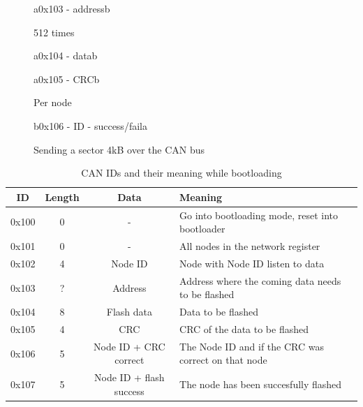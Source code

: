 \documentclass[twocolumn]{article}
\begin{document}
			\begin{figure}[t]
				\centering
				\begin{sequencediagram}
					
					\begin{call}{a}{0x103 - address}{b}{} %
					\end{call}
					\begin{sdloop}{512 times}
						\begin{call}{a}{0x104 - data}{b}{} %
						\end{call}
					\end{sdloop}
					\begin{call}{a}{0x105 - CRC}{b}{} %
						\begin{sdloop}{Per node}
							\begin{call}{b}{0x106 - ID - success/fail}{a}{} %
							\end{call}
						\end{sdloop}
					\end{call}
				
				\end{sequencediagram}
				\caption{Sending a sector 4kB over the CAN bus}
			\end{figure}
		
			\begin{table}[t]
				\caption{CAN IDs and their meaning while bootloading}
			
				\centering
				\begin{tabular}{|c|c|c|l|}
					\hline
					\textbf{ID} & \textbf{Length} & \textbf{Data} & \textbf{Meaning} \\ \hline
					0x100       & 0               & -                       & Go into bootloading mode, reset into bootloader \\ \hline
					0x101       & 0               & -                       & All nodes in the network register \\ \hline
					0x102       & 4               & Node ID                 & Node with Node ID listen to data \\ \hline
					0x103       & ?               & Address                 & Address where the coming data needs to be flashed \\ \hline
					0x104       & 8               & Flash data              & Data to be flashed \\ \hline
					0x105       & 4               & CRC                     & CRC of the data to be flashed \\ \hline
					0x106       & 5               & Node ID + CRC correct   & The Node ID and if the CRC was correct on that node \\ \hline
					0x107       & 5               & Node ID + flash success & The node has been succesfully flashed \\ \hline
				\end{tabular}
			\end{table}
	
\end{document}
